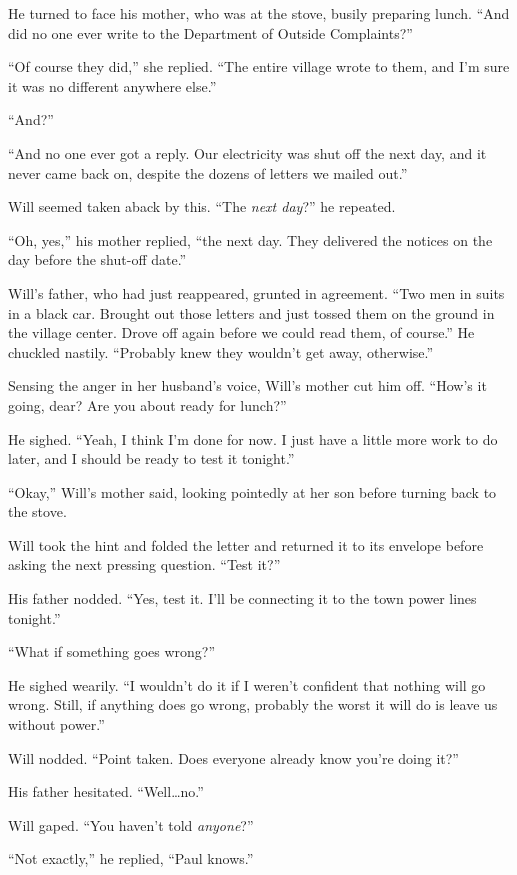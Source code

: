 \documentclass[12pt,letterpaper,oneside,english]{book}
\begin{document}
He turned to face his mother, who was at the stove, busily preparing
lunch. ``And did no one ever write to the Department of Outside
Complaints?''

``Of course they did,'' she replied. ``The entire village wrote to them,
and I'm sure it was no different anywhere else.''

``And?''

``And no one ever got a reply. Our electricity was shut off the next
day, and it never came back on, despite the dozens of letters we mailed
out.''

Will seemed taken aback by this. ``The \emph{next day}?'' he repeated.

``Oh, yes,'' his mother replied, ``the next day. They delivered the
notices on the day before the shut-off date.''

Will's father, who had just reappeared, grunted in agreement.
``Two men in suits in a black car. Brought out those letters and just
tossed them on the ground in the village center. Drove off again before
we could read them, of course.'' He chuckled nastily. ``Probably knew
they wouldn't get away, otherwise.''

Sensing the anger in her husband's voice, Will's mother cut him off.
``How's it going, dear? Are you about ready for lunch?''

He sighed. ``Yeah, I think I'm done for now. I just have a little more
work to do later, and I should be ready to test it tonight.''

``Okay,'' Will's mother said, looking pointedly at her son before
turning back to the stove.

Will took the hint and folded the letter and returned it to its
envelope before asking the next pressing question. ``Test it?''

His father nodded. ``Yes, test it. I'll be connecting it to the town
power lines tonight.''

``What if something goes wrong?''

He sighed wearily. ``I wouldn't do it if I weren't confident that
nothing will go wrong. Still, if anything does go wrong, probably the
worst it will do is leave us without power.''

Will nodded. ``Point taken. Does everyone already know you're doing it?''

His father hesitated. ``Well\ldots{}no.''

Will gaped. ``You haven't told \emph{anyone}?''

``Not exactly,'' he replied, ``Paul knows.''
\end{document}
